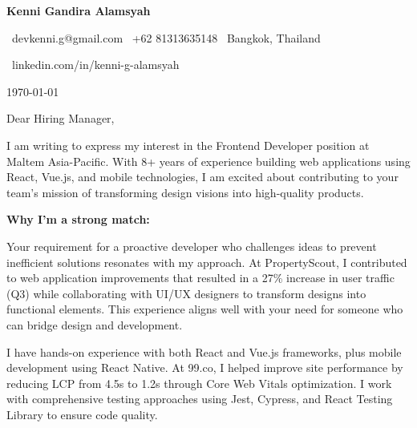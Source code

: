 \documentclass[12pt]{article}
\begin{document}
\begin{flushleft}
    {\Huge\textbf{Kenni Gandira Alamsyah}}

    \vspace{0.3cm}

    {\small
    \faEnvelope\ devkenni.g@gmail.com \quad
    \faPhone\ +62 81313635148 \quad
    \faMapMarker\ Bangkok, Thailand

    \faLinkedin\ linkedin.com/in/kenni-g-alamsyah
    }
\end{flushleft}

\vspace{0.8cm}

\today

\vspace{0.5cm}

Dear Hiring Manager,

\vspace{0.3cm}

I am writing to express my interest in the Frontend Developer position at Maltem Asia-Pacific. With 8+ years of experience building web applications using React, Vue.js, and mobile technologies, I am excited about contributing to your team's mission of transforming design visions into high-quality products.

\vspace{0.3cm}

\textbf{Why I'm a strong match:}

\vspace{0.2cm}

Your requirement for a proactive developer who challenges ideas to prevent inefficient solutions resonates with my approach. At PropertyScout, I contributed to web application improvements that resulted in a 27\% increase in user traffic (Q3) while collaborating with UI/UX designers to transform designs into functional elements. This experience aligns well with your need for someone who can bridge design and development.

\vspace{0.3cm}

I have hands-on experience with both React and Vue.js frameworks, plus mobile development using React Native. At 99.co, I helped improve site performance by reducing LCP from 4.5s to 1.2s through Core Web Vitals optimization. I work with comprehensive testing approaches using Jest, Cypress, and React Testing Library to ensure code quality.

\vspace{0.3cm}
\end{document}
